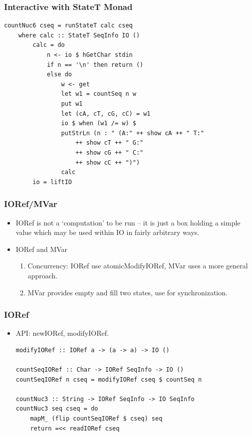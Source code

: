 \begin{frame}[fragile]\frametitle{Interactive with StateT Monad}

\begin{verbatim}
countNuc6 cseq = runStateT calc cseq
    where calc :: StateT SeqInfo IO ()
        calc = do
            n <- io $ hGetChar stdin
            if n == '\n' then return ()
            else do
                w <- get
                let w1 = countSeq n w 
                put w1
                let (cA, cT, cG, cC) = w1
                io $ when (w1 /= w) $
                putStrLn (n : " (A:" ++ show cA ++ " T:"
                    ++ show cT ++ " G:"
                    ++ show cG ++ " C:"
                    ++ show cC ++ ")") 
                calc
        io = liftIO
\end{verbatim}

\end{frame}

\begin{frame}\frametitle{IORef/MVar}

\begin{itemize}
\item
  IORef is not a `computation' to be run -- it is just a box holding a
  simple value which may be used within IO in fairly arbitrary ways.
\item
  IORef and MVar

  \begin{enumerate}[1.]
  \item
    Concurrency: IORef use atomicModifyIORef, MVar uses a more general
    approach.
  \item
    MVar provides empty and fill two states, use for synchronization.
  \end{enumerate}
\end{itemize}

\end{frame}

\begin{frame}[fragile]\frametitle{IORef}

\begin{itemize}
\item
  API: newIORef, modifyIORef.

\begin{verbatim}
modifyIORef :: IORef a -> (a -> a) -> IO ()

countSeqIORef :: Char -> IORef SeqInfo -> IO ()
countSeqIORef n cseq = modifyIORef cseq $ countSeq n 

countNuc3 :: String -> IORef SeqInfo -> IO SeqInfo 
countNuc3 seq cseq = do
    mapM_ (flip countSeqIORef $ cseq) seq
    return =<< readIORef cseq 
\end{verbatim}
\end{itemize}

\end{frame}

